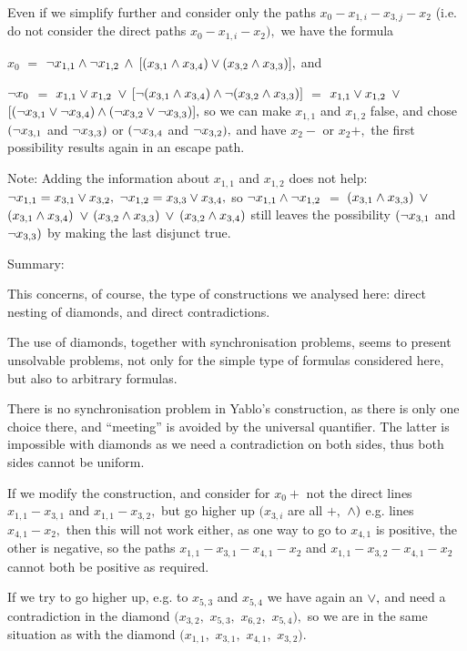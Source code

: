 Even if we simplify further and consider only the paths
$x_{0}-x_{1,i}-x_{3,j}-x_{2}$
(i.e. do not consider the direct paths $x_{0}-x_{1,i}-x_{2}),$
we have the formula

$x_{0}$ $=$ $ \neg x_{1,1} \wedge \neg x_{1,2}$ $ \wedge $ $[(x_{3,1} \wedge
x_{3,4}) \vee (x_{3,2} \wedge x_{3,3})],$ and

$ \neg x_{0}$ $=$ $x_{1,1} \vee x_{1,2}$ $ \vee $ $[ \neg (x_{3,1} \wedge
x_{3,4}) \wedge \neg (x_{3,2} \wedge x_{3,3})]$ $=$
$x_{1,1} \vee x_{1,2}$ $ \vee $ $[(\neg x_{3,1} \vee \neg x_{3,4}) \wedge (
\neg x_{3,2} \vee \neg x_{3,3})],$
so we can make $x_{1,1}$ and $x_{1,2}$ false, and chose $(\neg x_{3,1}$
and $ \neg x_{3,3})$ or
$(\neg x_{3,4}$ and $ \neg x_{3,2}),$ and have $x_{2}-$ or $x_{2}+,$ the
first possibility
results again in an escape path.

Note: Adding the information about $x_{1,1}$ and $x_{1,2}$ does not help:
$ \neg x_{1,1}=x_{3,1} \vee x_{3,2},$ $ \neg x_{1,2}=x_{3,3} \vee
x_{3,4},$ so $ \neg x_{1,1} \wedge \neg x_{1,2}$ $=$
$(x_{3,1} \wedge x_{3,3})$ $ \vee $ $(x_{3,1} \wedge x_{3,4})$ $ \vee $
$(x_{3,2} \wedge x_{3,3})$ $ \vee $ $(x_{3,2} \wedge x_{3,4})$ still
leaves the possibility $(\neg x_{3,1}$ and $ \neg x_{3,3})$ by making the
last disjunct
true.

 \xDH Summary:

This concerns, of course, the type of constructions we analysed here:
direct nesting of diamonds, and direct contradictions.

The use of diamonds, together with synchronisation problems, seems to
present
unsolvable problems, not only for the simple type of formulas considered
here, but also to arbitrary formulas.

There is no synchronisation problem in Yablo's construction, as there is
only one choice there, and ``meeting'' is avoided by the universal
quantifier. The latter is impossible with diamonds as we need a
contradiction
on both sides, thus both sides cannot be uniform.

 \xEj

 \xDH
If we modify the construction, and consider for $x_{0}+$ not the
direct lines $x_{1,1}-x_{3,1}$ and $x_{1,1}-x_{3,2},$ but go higher up
$(x_{3,i}$ are all $+,$ $ \wedge)$
e.g. lines $x_{4,1}-x_{2},$ then this will not work either, as one way
to go to $x_{4,1}$ is positive, the other is negative, so the paths
$x_{1,1}-x_{3,1}-x_{4,1}-x_{2}$ and $x_{1,1}-x_{3,2}-x_{4,1}-x_{2}$ cannot
both be positive
as required.

 \xDH
If we try to go higher up, e.g. to $x_{5,3}$ and $x_{5,4}$ we have again
an $ \vee,$
and need a contradiction in the diamond $(x_{3,2},$ $x_{5,3},$ $x_{6,2},$
$x_{5,4}),$
so we are in the same situation as with the diamond $(x_{1,1},$ $x_{3,1},$
$x_{4,1},$ $x_{3,2}).$

